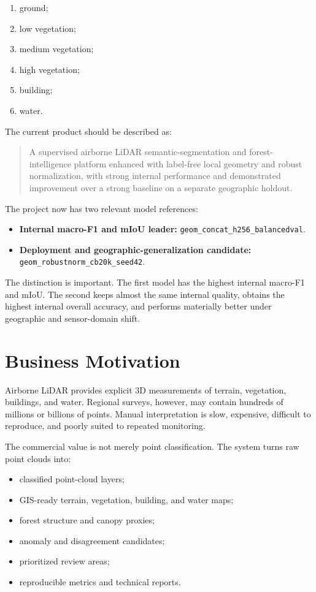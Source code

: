 \documentclass[11pt,a4paper]{article}
\newcommand{\modelinternal}{\texttt{geom\_concat\_h256\_balancedval}}
\newcommand{\modelrobust}{\texttt{geom\_robustnorm\_cb20k\_seed42}}
\begin{document}
\begin{enumerate}
  \item ground;
  \item low vegetation;
  \item medium vegetation;
  \item high vegetation;
  \item building;
  \item water.
\end{enumerate}

The current product should be described as:

\begin{quote}
A supervised airborne LiDAR semantic-segmentation and forest-intelligence platform enhanced with label-free local geometry and robust normalization, with strong internal performance and demonstrated improvement over a strong baseline on a separate geographic holdout.
\end{quote}

The project now has two relevant model references:

\begin{itemize}
  \item \textbf{Internal macro-F1 and mIoU leader:} \modelinternal.
  \item \textbf{Deployment and geographic-generalization candidate:} \modelrobust.
\end{itemize}

The distinction is important. The first model has the highest internal macro-F1 and mIoU. The second keeps almost the same internal quality, obtains the highest internal overall accuracy, and performs materially better under geographic and sensor-domain shift.

\section{Business Motivation}

Airborne LiDAR provides explicit 3D measurements of terrain, vegetation, buildings, and water. Regional surveys, however, may contain hundreds of millions or billions of points. Manual interpretation is slow, expensive, difficult to reproduce, and poorly suited to repeated monitoring.

The commercial value is not merely point classification. The system turns raw point clouds into:

\begin{itemize}
  \item classified point-cloud layers;
  \item GIS-ready terrain, vegetation, building, and water maps;
  \item forest structure and canopy proxies;
  \item anomaly and disagreement candidates;
  \item prioritized review areas;
  \item reproducible metrics and technical reports.
\end{itemize}
\end{document}
